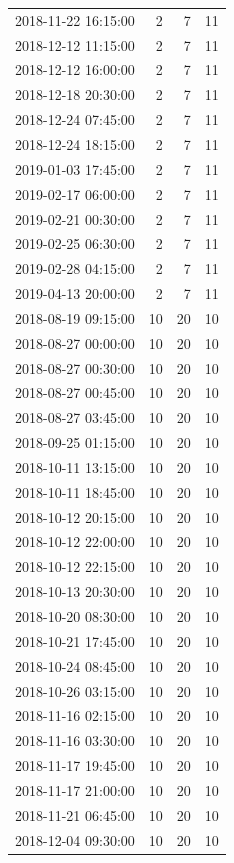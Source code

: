 \begin{tabular}{lrrr}
2018-11-22 16:15:00 & 2 & 7 & 11 \\
2018-12-12 11:15:00 & 2 & 7 & 11 \\
2018-12-12 16:00:00 & 2 & 7 & 11 \\
2018-12-18 20:30:00 & 2 & 7 & 11 \\
2018-12-24 07:45:00 & 2 & 7 & 11 \\
2018-12-24 18:15:00 & 2 & 7 & 11 \\
2019-01-03 17:45:00 & 2 & 7 & 11 \\
2019-02-17 06:00:00 & 2 & 7 & 11 \\
2019-02-21 00:30:00 & 2 & 7 & 11 \\
2019-02-25 06:30:00 & 2 & 7 & 11 \\
2019-02-28 04:15:00 & 2 & 7 & 11 \\
2019-04-13 20:00:00 & 2 & 7 & 11 \\
2018-08-19 09:15:00 & 10 & 20 & 10 \\
2018-08-27 00:00:00 & 10 & 20 & 10 \\
2018-08-27 00:30:00 & 10 & 20 & 10 \\
2018-08-27 00:45:00 & 10 & 20 & 10 \\
2018-08-27 03:45:00 & 10 & 20 & 10 \\
2018-09-25 01:15:00 & 10 & 20 & 10 \\
2018-10-11 13:15:00 & 10 & 20 & 10 \\
2018-10-11 18:45:00 & 10 & 20 & 10 \\
2018-10-12 20:15:00 & 10 & 20 & 10 \\
2018-10-12 22:00:00 & 10 & 20 & 10 \\
2018-10-12 22:15:00 & 10 & 20 & 10 \\
2018-10-13 20:30:00 & 10 & 20 & 10 \\
2018-10-20 08:30:00 & 10 & 20 & 10 \\
2018-10-21 17:45:00 & 10 & 20 & 10 \\
2018-10-24 08:45:00 & 10 & 20 & 10 \\
2018-10-26 03:15:00 & 10 & 20 & 10 \\
2018-11-16 02:15:00 & 10 & 20 & 10 \\
2018-11-16 03:30:00 & 10 & 20 & 10 \\
2018-11-17 19:45:00 & 10 & 20 & 10 \\
2018-11-17 21:00:00 & 10 & 20 & 10 \\
2018-11-21 06:45:00 & 10 & 20 & 10 \\
2018-12-04 09:30:00 & 10 & 20 & 10 \\

\end{tabular}
